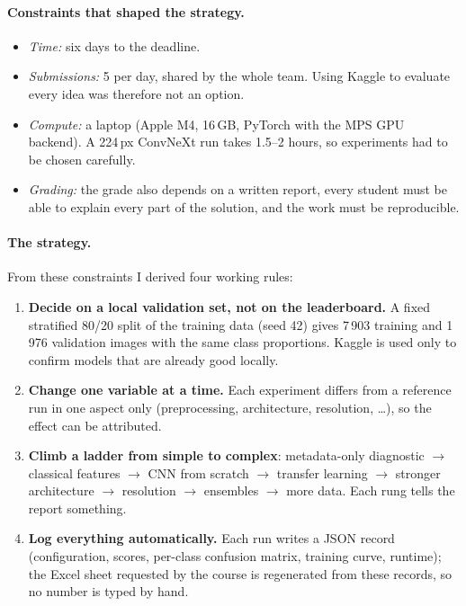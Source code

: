 \documentclass[11pt,a4paper]{article}
\begin{document}
\paragraph{Constraints that shaped the strategy.}
\begin{itemize}[leftmargin=*]
\item \emph{Time:} six days to the deadline.
\item \emph{Submissions:} 5 per day, shared by the whole team. Using Kaggle to evaluate every idea was
therefore not an option.
\item \emph{Compute:} a laptop (Apple M4, 16\,GB, PyTorch with the MPS GPU backend). A 224\,px
ConvNeXt run takes 1.5--2 hours, so experiments had to be chosen carefully.
\item \emph{Grading:} the grade also depends on a written report, every student must be able to
explain every part of the solution, and the work must be reproducible.
\end{itemize}

\paragraph{The strategy.} From these constraints I derived four working rules:
\begin{enumerate}[leftmargin=*]
\item \textbf{Decide on a local validation set, not on the leaderboard.} A fixed stratified 80/20
split of the training data (seed 42) gives 7\,903 training and 1\,976 validation images with the same
class proportions. Kaggle is used only to confirm models that are already good locally.
\item \textbf{Change one variable at a time.} Each experiment differs from a reference run in one
aspect only (preprocessing, architecture, resolution, \dots), so the effect can be attributed.
\item \textbf{Climb a ladder from simple to complex}: metadata-only diagnostic $\to$ classical
features $\to$ CNN from scratch $\to$ transfer learning $\to$ stronger architecture $\to$ resolution
$\to$ ensembles $\to$ more data. Each rung tells the report something.
\item \textbf{Log everything automatically.} Each run writes a JSON record (configuration, scores,
per-class confusion matrix, training curve, runtime); the Excel sheet requested by the course is
regenerated from these records, so no number is typed by hand.
\end{enumerate}
\end{document}
